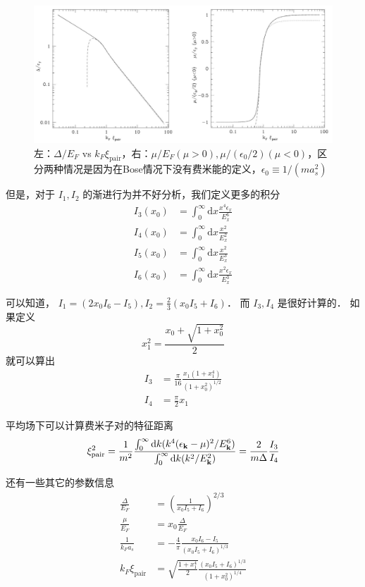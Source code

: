 \begin{figure}[ht]
\centering
\includegraphics[width=15cm]{./figures/BCSBEC1.pdf}
\caption{左：$\Delta/E_F$ vs $k_F\xi_{\text{pair}}$，右：$\mu/E_F(\mu>0), \mu/(\epsilon_0/2)(\mu<0)$，区分两种情况是因为在Bose情况下没有费米能的定义，$\epsilon_0\equiv1/(ma_s^2)$} \label{BCSBEC_fig1}
\end{figure}

但是，对于 $I_1, I_2$ 的渐进行为并不好分析，我们定义更多的积分
\begin{align}
I_3(x_0) &=\int_0^\infty\text{d}x\frac{x^4\epsilon_x}{E_x^6}\\
I_4(x_0) &=\int_0^\infty\text{d}x\frac{x^2}{E_x^2}\\
I_5(x_0) &=\int_0^\infty\text{d}x\frac{x^2}{E_x^3}\\
I_6(x_0) &=\int_0^\infty\text{d}x\frac{x^2\epsilon_x}{E_x^3}
\end{align}

可以知道， $I_1=(2x_0I_6-I_5),I_2 = \frac{2}{3}(x_0I_5+I_6)$． 而 $I_3,I_4$ 是很好计算的． 如果定义
\begin{equation}
x_1^2=\frac{x_0+\sqrt{1+x_0^2}}{2}
\end{equation}
就可以算出
\begin{align}
I_3&=\frac{\pi}{16}\frac{x_1(1+x_1^4)}{(1+x_0^2)^{1/2}}\\
I_4&=\frac{\pi}{2}x_1
\end{align}

平均场下可以计算费米子对的特征距离
\begin{equation}
\xi_{\text{pair}}^2 = \frac{1}{m^2}\frac{\int_0^\infty\text{d}k(k^4(\epsilon_{\bf k}-\mu)^2/E_{\bf k}^6)}{\int_0^\infty\text{d}k(k^2/E_{\bf k}^2)} = \frac{2}{m\Delta}\frac{I_3}{I_4}
\end{equation}

还有一些其它的参数信息
\begin{align}
\frac{\Delta}{E_F} &= \left(\frac{1}{x_0I_5+I_6}\right)^{2/3}\\
\frac{\mu}{E_F} &= x_0\frac{\Delta}{E_F} \\
\frac{1}{k_Fa_s} &= -\frac{4}{\pi}\frac{x_0I_6-I_5}{(x_0I_5+I_6)^{1/3}}\\
k_F\xi_{\text{pair}} &= \sqrt{\frac{1+x_1^4}{2}}\frac{(x_0I_5+I_6)^{1/3}}{(1+x_0^2)^{1/4}}
\end{align}

